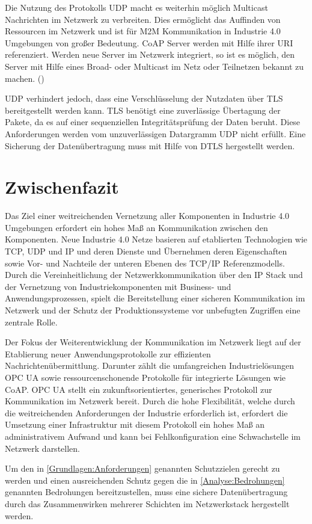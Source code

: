Die Nutzung des Protokolls \ac{UDP} macht es weiterhin möglich Multicast Nachrichten im Netzwerk zu verbreiten. Dies ermöglicht das Auffinden von Ressourcen im Netzwerk und ist für \ac{M2M} Kommunikation in Industrie 4.0 Umgebungen von großer Bedeutung. \ac{CoAP} Server werden mit Hilfe ihrer \ac{URI} referenziert. Werden neue Server im Netzwerk integriert, so ist es möglich, den Server mit Hilfe eines Broad- oder Multicast im Netz oder Teilnetzen bekannt zu machen. (\cite{trapickin2013})

\ac{UDP} verhindert jedoch, dass eine Verschlüsselung der Nutzdaten über \ac{TLS} bereitgestellt werden kann. \ac{TLS} benötigt eine zuverlässige Übertagung der Pakete, da es auf einer sequenziellen Integritätsprüfung der Daten beruht. Diese Anforderungen werden vom unzuverlässigen Datargramm \ac{UDP} nicht erfüllt. Eine Sicherung der Datenübertragung muss mit Hilfe von \ac{DTLS} hergestellt werden.

\section{Zwischenfazit}
Das Ziel einer weitreichenden Vernetzung aller Komponenten in Industrie 4.0 Umgebungen erfordert ein hohes Maß an Kommunikation zwischen den Komponenten. Neue Industrie 4.0 Netze basieren auf etablierten Technologien wie \ac{TCP}, \ac{UDP} und \ac{IP} und deren Dienste und Übernehmen deren Eigenschaften sowie Vor- und Nachteile der unteren Ebenen des \ac{TCP}/\ac{IP} Referenzmodells. Durch die Vereinheitlichung der Netzwerkkommunikation über den \ac{IP} Stack und der Vernetzung von Industriekomponenten mit Business- und Anwendungsprozessen, spielt die Bereitstellung einer sicheren Kommunikation im Netzwerk und der Schutz der Produktionssysteme vor unbefugten Zugriffen eine zentrale Rolle.

Der Fokus der Weiterentwicklung der Kommunikation im Netzwerk liegt auf der Etablierung neuer Anwendungsprotokolle zur effizienten Nachrichtenübermittlung. Darunter zählt die umfangreichen Industrielösungen \ac{OPC UA} sowie ressourcenschonende Protokolle für integrierte Lösungen wie \ac{CoAP}. \ac{OPC UA} stellt ein zukunftsorientiertes, generisches Protokoll zur Kommunikation im Netzwerk bereit. Durch die hohe Flexibilität, welche durch die weitreichenden Anforderungen der Industrie erforderlich ist, erfordert die Umsetzung einer Infrastruktur mit diesem Protokoll ein hohes Maß an administrativem Aufwand und kann bei Fehlkonfiguration eine Schwachstelle im Netzwerk darstellen. 

Um den in \autoref{Grundlagen:Anforderungen} genannten Schutzzielen gerecht zu werden und einen ausreichenden Schutz gegen die in \autoref{Analyse:Bedrohungen} genannten Bedrohungen bereitzustellen, muss eine sichere Datenübertragung durch das Zusammenwirken mehrerer Schichten im Netzwerkstack hergestellt werden.